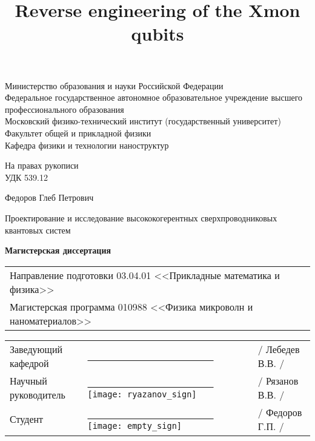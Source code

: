 \documentclass[12pt, twoside]{report}
\title{Reverse engineering of the Xmon qubits}
\numberwithin{equation}{section}
\begin{document}
\begin{titlepage}
\par 
\vspace*{-2cm}
\begin{center}
Министерство образования и науки Российской Федерации\\
Федеральное государственное автономное образовательное учреждение высшего\\ 
профессионального образования \\
\glqq Московский физико-технический институт (государственный университет) \grqq \\
Факультет общей и прикладной физики\\
Кафедра физики и технологии наноструктур
\end{center}

\vspace*{0.2cm}
\begin{flushright}
На правах рукописи\\
УДК 539.12
\end{flushright}

\centering
{}

\vfill

\begin{center}
Федоров Глеб Петрович

\vspace*{0.5cm}

{\large Проектирование и исследование высококогерентных сверхпроводниковых квантовых систем}

\vspace*{1cm}

{\bf Магистерская диссертация}

\vspace*{1cm}

\begin{tabular*}{0.8\textwidth}{l}
Направление подготовки 03.04.01 <<Прикладные математика и физика>>\\
Магистерская программа 010988 <<Физика микроволн и наноматериалов>>\\
\end{tabular*}

\vspace*{2cm}

\begin{tabular*}{0.8\textwidth}{lll}
Заведующий кафедрой & \underline{\ \ \ \ \ \ \ \ \ \ \ \ \ \ \ \ \ \ \ \ \ \ \ \ \ \ } &	/ Лебедев В.В. / \\
Научный руководитель & \underline{\ \ \ \ \ \ \ \ \ \ \ \ \ \ \ \ \ \ \ \ \ \ \ \ \ \ } \hspace*{-4cm} \texttt{[image: ryazanov\_sign]}& / Рязанов В.В. / \\
Студент		    & \underline{\ \ \ \ \ \ \ \ \ \ \ \ \ \ \ \ \ \ \ \ \ \ \ \ \ \ } \hspace*{-4cm} \texttt{[image: empty\_sign]} & / Федоров Г.П. / \\
\end{tabular*}


\end{center}
\end{titlepage}
\end{document}
